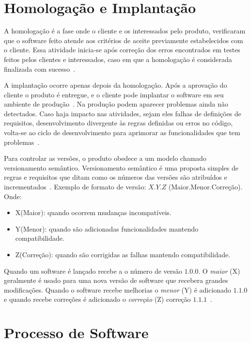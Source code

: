 \section{Homologação e Implantação}

A homologação é a fase onde o cliente e os interessados pelo produto, verificaram que o software feito atende aos critérios de aceite previamente estabelecidos com o cliente. 
Essa atividade inicia-se após correção dos erros encontrados em testes feitos pelos clientes e interessados, caso em que a homologação é considerada finalizada com sucesso~\cite{santos2017cp}.

A implantação ocorre apenas depois da homologação.
Após a aprovação do cliente o produto é entregue, e o cliente pode implantar o software em seu ambiente de produção~\cite{pressman2016engenharia}.
Na produção podem aparecer problemas ainda não detectados.
Caso haja impacto nas atividades, sejam eles falhas de definições de requisitos, desenvolvimento divergente às regras definidas ou erros no código, volta-se ao ciclo de desenvolvimento para aprimorar as funcionalidades que tem problemas~\cite{salvador2015processo}.

Para controlar as versões, o produto obedece a um modelo chamado versionamento semântico.
Versionamento semântico é uma proposta simples de regras e requisitos que ditam como os números das versões são atribuídos e incrementados~\cite{palestino2015estudo}. 
Exemplo de formato de versão: $X.Y.Z$ (Maior.Menor.Correção). Onde:

\begin{itemize}
    \item X(Maior): quando ocorrem mudanças incompatíveis.
    \item Y(Menor): quando são adicionadas funcionalidades mantendo compatibilidade.  
    \item Z(Correção):  quando são corrigidas as falhas mantendo compatibilidade. 
    
\end{itemize}

Quando um software é lançado recebe a o número de versão $1.0.0$.
O \textit{maior} (X) geralmente é usado para uma nova versão de software que recebera grandes modificações.
Quando o software recebe melhorias o \textit{menor} (Y) é adicionado $1.1.0$ e quando recebe correções é adicionado o \textit{correção} (Z) correção $1.1.1$~\cite{versionamento}.


\section{Processo de Software}

